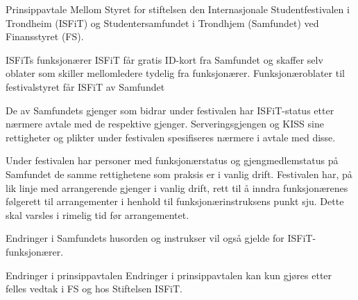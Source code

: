 \begin{instruks}{Prinsippavtale Mellom Styret for stiftelsen den Internasjonale Studentfestivalen i
        Trondheim (ISFiT) og Studentersamfundet i Trondhjem (Samfundet) ved Finansstyret
        (FS).}{}{}
\begin{instruksledd}{ISFiTs funksjonærer}
        ISFiT får gratis ID-kort fra Samfundet og skaffer selv oblater som skiller mellomledere tydelig fra
        funksjonærer.
        Funksjonæroblater til festivalstyret får ISFiT av Samfundet

        De av Samfundets gjenger som bidrar under festivalen har ISFiT-status etter nærmere avtale med de
        respektive
        gjenger. Serveringsgjengen og KISS sine rettigheter og plikter under festivalen spesifiseres nærmere
        i avtale med
        disse.

        Under festivalen har personer med funksjonærstatus og gjengmedlemstatus på Samfundet de samme
        rettighetene som
        praksis er i vanlig drift. Festivalen har, på lik linje med arrangerende gjenger i vanlig drift,
        rett til å inndra
        funksjonærenes følgerett til arrangementer i henhold til funksjonærinstruksens punkt sju. Dette skal
        varsles i rimelig
        tid før arrangementet.

        Endringer i Samfundets husorden og instrukser vil også gjelde for ISFiT-funksjonærer.
    \end{instruksledd}


    \begin{instruksledd}{Endringer i prinsippavtalen}
        Endringer i prinsippavtalen kan kun gjøres etter felles vedtak i FS og hos Stiftelsen ISFiT.
    \end{instruksledd} 


\end{instruks}


